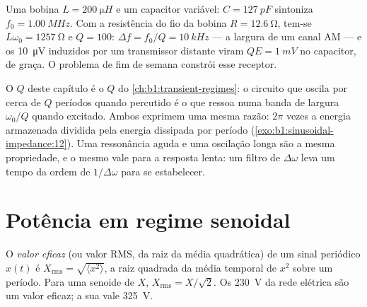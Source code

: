 \begin{example}\label{ex:b1:sinusoidal-impedance:radio}
Uma bobina $L = \qty{200}{\micro H}$ e um capacitor variável: $C =
\qty{127}{pF}$ sintoniza $f_0 = \qty{1.00}{MHz}$. Com a resistência do fio
da bobina $R = \qty{12.6}{\ohm}$, tem-se $L\omega_0 = \qty{1257}{\ohm}$ e
$Q = 100$:  $\Delta f = f_0/Q = \qty{10}{kHz}$ --- a largura
de um canal AM --- e os \qty{10}{\micro V} induzidos por um transmissor
distante viram $QE = \qty{1}{mV}$ no capacitor, de
graça. O problema de fim de semana constrói esse receptor.
\end{example}

\begin{remark}\label{rem:b1:sinusoidal-impedance:Q}
O $Q$ deste capítulo é o $Q$ do \cref{ch:b1:transient-regimes}:
o circuito que oscila por cerca de $Q$ períodos quando percutido é o
que ressoa numa banda de largura $\omega_0/Q$ quando excitado. Ambos
exprimem uma mesma razão: $2\pi$ vezes a energia armazenada dividida pela energia
dissipada por período (\cref{exo:b1:sinusoidal-impedance:12}). Uma
ressonância aguda e uma oscilação longa são a mesma propriedade, e o mesmo vale para a
resposta lenta: um filtro de  $\Delta\omega$ leva um tempo da
ordem de $1/\Delta\omega$ para se estabelecer.
\end{remark}

\section{Potência em regime senoidal}

\begin{definition}\label{def:b1:sinusoidal-impedance:rms}
O \emph{valor eficaz} (ou valor RMS, da raiz da média quadrática) de um
sinal periódico $x(t)$ é $X_{\mathrm{rms}} = \sqrt{\langle x^2\rangle}$, a
raiz quadrada da média temporal de $x^2$ sobre um período. Para uma senoide
de  $X$, $X_{\mathrm{rms}} = X/\sqrt2$. Os \qty{230}{V} da
rede elétrica são um valor eficaz; a sua  vale \qty{325}{V}.
\end{definition}

